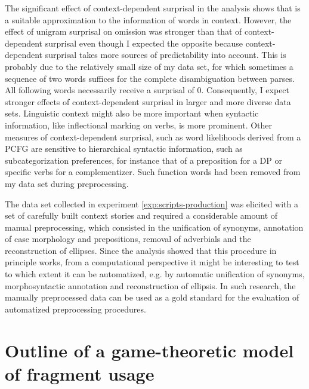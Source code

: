 The significant effect of context-dependent surprisal in the analysis shows that is a suitable approximation to the information of words in context. However, the effect of unigram surprisal on omission was stronger than that of context-dependent surprisal even though I expected the opposite because context-dependent surprisal takes more sources of predictability into account. This is probably due to the relatively small size of my data set, for which sometimes a sequence of two words suffices for the complete disambiguation between parses. All following words necessarily receive a surprisal of 0. Consequently, I expect stronger effects of context-dependent surprisal in larger and more diverse data sets. Linguistic context might also be more important when syntactic information, like inflectional marking on verbs, is more prominent. Other measures of context-dependent surprisal, such as word likelihoods derived from a PCFG \citep{hale2001} are sensitive to hierarchical syntactic information, such as subcategorization preferences, for instance that of a preposition for a DP or specific verbs for a complementizer. Such function words had been removed from my data set during preprocessing.

The data set collected in experiment \ref{exp:scripts-production} was elicited with a set of carefully built context stories and required a considerable amount of manual preprocessing, which consisted in the unification of synonyms, annotation of case morphology and prepositions, removal of adverbials and the reconstruction of ellipses. Since the analysis showed that this procedure in principle works, from a computational perspective it might be interesting to test to which extent it can be automatized, e.g. by automatic unification of synonyms, morphosyntactic annotation and reconstruction of ellipsis. In such research, the manually preprocessed data can be used as a gold standard for the evaluation of automatized preprocessing procedures.

\section[Outline of a game-theoretic model of fragment usage]{Outline of a game-theoretic model of fragment usage}

